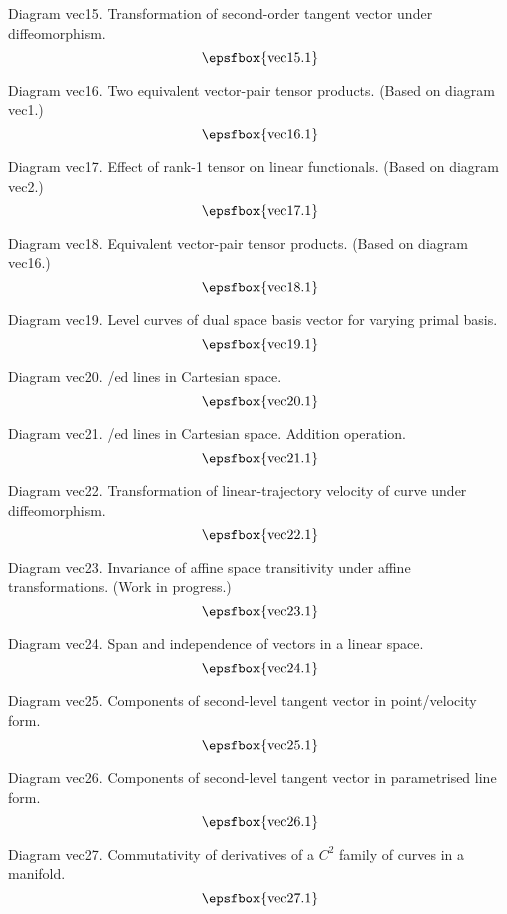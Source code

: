 \filleject

Diagram vec15. Transformation of second-order tangent vector under
diffeomorphism.
$$
\centerline{\epsfbox{vec15.1}}
$$

Diagram vec16. Two equivalent vector-pair tensor products. (Based on diagram
vec1.)
$$
\centerline{\epsfbox{vec16.1}}
$$

Diagram vec17. Effect of rank-1 tensor on linear functionals. (Based on diagram
vec2.)
$$
\centerline{\epsfbox{vec17.1}}
$$

Diagram vec18. Equivalent vector-pair tensor products. (Based on diagram
vec16.)
$$
\centerline{\epsfbox{vec18.1}}
$$

\filleject

Diagram vec19. Level curves of dual space basis vector for varying primal basis.
$$
\centerline{\epsfbox{vec19.1}}
$$

Diagram vec20. \Parametris/ed lines in Cartesian space.
$$
\centerline{\epsfbox{vec20.1}}
$$

Diagram vec21. \Parametris/ed lines in Cartesian space. Addition operation.
$$
\centerline{\epsfbox{vec21.1}}
$$

Diagram vec22. Transformation of linear-trajectory velocity of curve under
diffeomorphism.
$$
\centerline{\epsfbox{vec22.1}}
$$

\filleject

Diagram vec23. Invariance of affine space transitivity under affine
transformations. (Work in progress.)
$$
\centerline{\epsfbox{vec23.1}}
$$

Diagram vec24. Span and independence of vectors in a linear space.
$$
\centerline{\epsfbox{vec24.1}}
$$

Diagram vec25. Components of second-level tangent vector in point/velocity form.
$$
\centerline{\epsfbox{vec25.1}}
$$

Diagram vec26. Components of second-level tangent vector in parametrised line
form.
$$
\centerline{\epsfbox{vec26.1}}
$$

\filleject

Diagram vec27. Commutativity of derivatives of a $C^2$ family of curves in a
manifold.
$$
\centerline{\epsfbox{vec27.1}}
$$

